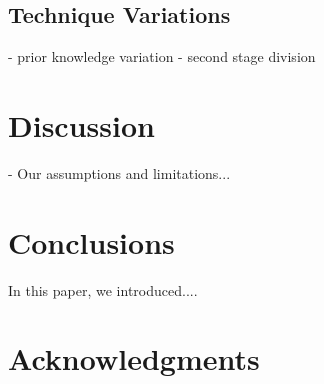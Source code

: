 \documentclass{acm_proc_article-sp}
\begin{document}
\subsection{Technique 	Variations}
- prior knowledge variation
- second stage division
\section{Discussion}
- Our assumptions and limitations...

\section{Conclusions}
In this paper, we introduced....

\section{Acknowledgments}


{\footnotesize
}  %
%
%
\end{document}
